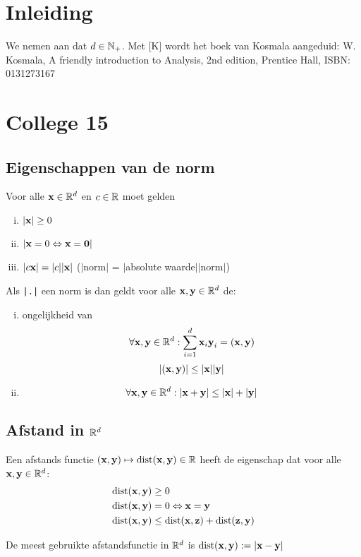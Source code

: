 \documentclass{2wa40summary}
\begin{document}
	\maketitle
	\thispagestyle{empty}
	\newpage
	
	\section{Inleiding}
	We nemen aan dat $d\in\naturals_+$. Met [K] wordt het boek van Kosmala aangeduid: W. Kosmala, A friendly introduction to Analysis, 2nd edition, Prentice Hall, ISBN: 0131273167
	
	\section{College 15}
	\subsection{Eigenschappen van de norm}
	Voor alle $\x\in \reals^d$ en $c\in\reals$ moet gelden
	\begin{enumerate}[(i)]
		\item $|\x| \geq 0$
		\item $\abs{\x=0 \Leftrightarrow \x=\zero}$
		\item $|c\x|=|c||\x|$ ($|$norm$|$ = $|$absolute waarde$||$norm$|$)
	\end{enumerate}
	Als \verb#|.|# een norm is dan geldt voor alle $\x,\y\in \reals^d$ de:
	\begin{enumerate}[(i)]
		\item ongelijkheid van 
		\[\forall \x,\y \in \reals^d: \sum_{i=1}^{d}\x_i \y_i = (\x,\y)\]
		\[|(\x,\y)| \leq |\x||\y|\]
		\item {}
		\[\forall \x,\y \in \reals^d: |\x+\y|\leq |\x|+|\y|\]
	\end{enumerate}
	\subsection{Afstand in $\reals^d$}
	\begin{define}
		Een afstands functie $(\x,\y)\mapsto\dist(\x,\y)\in\reals$ heeft de eigenschap dat voor alle $\x,\y\in\reals^d$:
		\begin{align*}
		\dist(\x,\y) & \geq 0 \\
		\dist(\x,\y) & =0 \Leftrightarrow \x=\y \\
		\dist(\x,\y) & \leq \dist(\x,\z) + \dist(\z,\y)
		\end{align*}
	\end{define}
	De meest gebruikte afstandsfunctie in $\reals^d$ is $\dist(\x,\y):=|\x-\y|$
	
\end{document}
